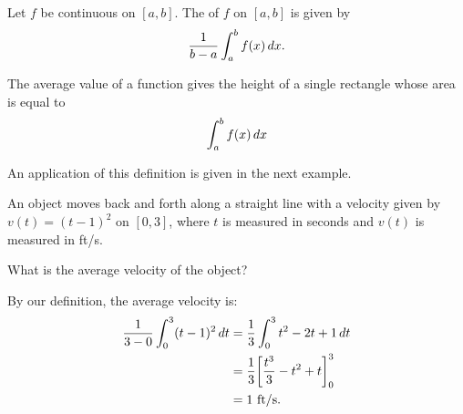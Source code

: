 \documentclass{ximera}
\begin{document}
\begin{definition}
  Let $f$ be continuous on $[a,b]$. The  of $f$ on
  $[a,b]$ is given by
  \[
  \frac{1}{b-a}\int_a^b f(x)\,d x.
  \]
\end{definition}

The average value of a function gives the height of a single rectangle whose area is equal to
\[
\int_a^b f(x) \,d x
\]
\begin{image}
\end{image}

An application of this definition is given in the next example.


\begin{example}
An object moves back and forth along a straight line with a velocity
given by $v(t) = (t-1)^2$ on $[0,3]$, where $t$ is measured in seconds
and $v(t)$ is measured in ft/s.

What is the average velocity of the object?
\begin{explanation}
By our definition, the average velocity is:
\begin{align*}
\frac{1}{3-0}\int_0^3 (t-1)^2\,d t &=\frac13 \int_0^3 t^2-2t+1\,d t\\
&= \frac13\bigg[ \frac{t^3}{3}-t^2+t \bigg]_0^3\\
&= 1\text{ ft/s}.
\end{align*}
\end{explanation}
\end{example}
\end{document}
